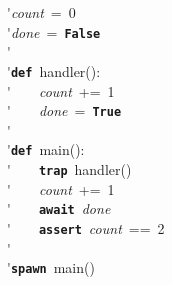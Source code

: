 \'\>\textit{count}~=~0\\

\'\>\textit{done}~=~\texttt{\textbf{False}}\\

\'\>\\

\'\>\texttt{\textbf{def}}~handler():\\

\'\>~~~~\textit{count}~+=~1\\

\'\>~~~~\textit{done}~=~\texttt{\textbf{True}}\\

\'\>\\

\'\>\texttt{\textbf{def}}~main():\\

\'\>~~~~\texttt{\textbf{trap}}~handler()\\

\'\>~~~~\textit{count}~+=~1\\

\'\>~~~~\texttt{\textbf{await}}~\textit{done}\\

\'\>~~~~\texttt{\textbf{assert}}~\textit{count}~==~2\\

\'\>\\

\'\>\texttt{\textbf{spawn}}~main()